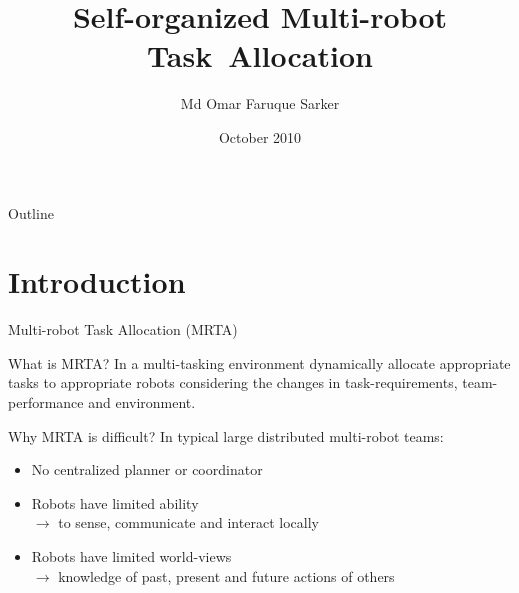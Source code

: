 \documentclass{beamer}
\title[Self-organized Multi-robot Task~Allocation] 
{%
  Self-organized Multi-robot Task~Allocation%
}
\author[MOFSarker]
{
  Md Omar Faruque Sarker
}
\institute[UWN]
{
 Cognitive Robotics Research Centre\\
 University of Wales, Newport
}
\date{October 2010}
\begin{document}
\begin{frame}
  \titlepage
\end{frame}

\begin{frame}{Outline}
  \tableofcontents
\end{frame}
\section{Introduction}
\begin{frame}[t]{Multi-robot Task Allocation (MRTA)}
	
\begin{block}{What is MRTA?}
In a multi-tasking environment dynamically allocate appropriate tasks to appropriate robots considering the  changes in \alert{task-requirements, team-performance and environment.}
\end{block}
  	
\begin{block}{Why MRTA is difficult?}
In typical large distributed multi-robot teams:
\begin{itemize}
\item No centralized planner or coordinator
\item \alert{Robots have limited ability}\\
$\rightarrow$ \small to sense, communicate and interact locally
\item \normalsize \alert{Robots have limited world-views}\\ 
$\rightarrow$ \small knowledge of past, present and future actions of others
\end{itemize}
\end{block}
  	
\end{frame}
\end{document}
